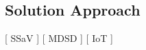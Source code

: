 \subsection{Solution Approach}\label{sec:SolutionApproach}
[ SSaV ] [ MDSD ] [ IoT ] 
\newline
[ Casper ] [ Phu ] [ Simon ]
\newline

\begin{comment}
The Smart door design is split into the hardware actuators and sensors, and the sofware that connects and gives logic and connects them together. For the hardware to work it must have a software that supports it for our requirements for the system to work. 

The hardware design is split up into 3 components, buttons, Bluetooth and LED.  First for the basic functionality, such as unlocking and locking using the buttons and other potential component such as potenti-o-meter. Second being bluetooth, here several protocols exists. There is SPP which allows for sending commands, but it has been deprecated1. There is GATT2 which allows for 1-1 communications and stops advertising as soon as it has a connection. It requires BLE which some older phones may not be able to run. There is BLE itself which is a more modern version of bluetooth and better in most regards, especilally when it comes to power consumption3. But is not backward compatible with classic, which will lower potential users. Bluetooth classic which often used for music transfer3 has the advantage of being older and thereby more devices run it. While having the features required the group chose this, while the drawback being increased power consumption, having more potential customers is more valued. And lastly the LED to show shift in colors to show the current state is changed for the statemachince.
For the Software part, chosing the correct coding language to implement the smart door corresponds with in requirement of the previous section aswell coding the Statemachine, The ESP is mainly writtin in C, though it has API’s that can integrete with others aswell as some support for C alternative, C++, C is the most viable, being a low level memeory allocating code, giving the system the better potential to optimise code to validate our needs for the system \cite{Grothotkov_2022:ESP_c++}\cite{codedamn:news_2023}. 


\end{comment}
